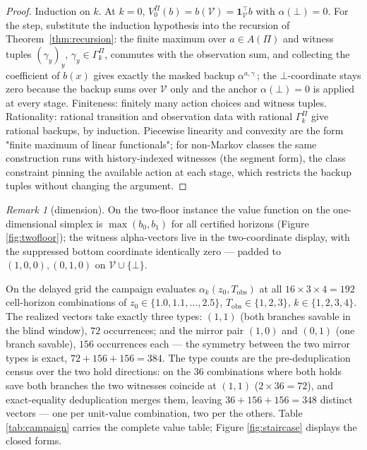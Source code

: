 \documentclass[10pt,twocolumn]{article}
\theoremstyle{plain}
\theoremstyle{definition}
\theoremstyle{remark}
\newtheorem{remark}[theorem]{Remark}
\begin{document}
\begin{proof}
Induction on \(k\). At \(k = 0\),
\(V^{\Pi}_{0}(b) = b(\mathcal{V}) = \mathbf{1}_{\mathcal{V}}^{\top} b\)
with \(\alpha(\bot) = 0\). For the step, substitute the induction
hypothesis into the recursion of Theorem~\ref{thm:recursion}: the finite
maximum over \(a \in A(\Pi)\) and witness tuples
\((\gamma_{y})_{y}\), \(\gamma_{y} \in \Gamma^{\Pi}_{k}\), commutes
with the observation sum, and collecting the coefficient of \(b(x)\)
gives exactly the masked backup \(\alpha^{a, \gamma_{\cdot}}\); the
\(\bot\)-coordinate stays zero because the backup sums over
\(\mathcal{V}\) only and the anchor \(\alpha(\bot) = 0\) is applied
at every stage. Finiteness: finitely many action choices and witness
tuples. Rationality: rational transition and observation data with
rational \(\Gamma^{\Pi}_{k}\) give rational backups, by induction.
Piecewise linearity and convexity are the form "finite maximum of linear
functionals"; for non-Markov classes the same construction runs with
history-indexed witnesses (the segment form), the class constraint
pinning the available action at each stage, which restricts the backup
tuples without changing the argument.
\end{proof}

\begin{remark}[dimension]\label{rem:dim}
On the two-floor instance the value function on the one-dimensional
simplex is \(\max(b_{0}, b_{1})\) for all certified horizons (Figure
\ref{fig:twofloor}); the witness alpha-vectors live in the two-coordinate
display, with the suppressed bottom coordinate identically zero --- padded
to \((1,0,0), (0,1,0)\) on \(\mathcal{V} \cup \{\bot\}\).
\end{remark}

On the delayed grid the campaign evaluates
\(\alpha_{k}(z_{0}, T_{\mathrm{obs}})\) at all
\(16 \times 3 \times 4 = 192\) cell-horizon combinations of
\(z_{0} \in \{1.0, 1.1, \dots, 2.5\}\),
\(T_{\mathrm{obs}} \in \{1, 2, 3\}\), \(k \in \{1, 2, 3, 4\}\). The
realized vectors take exactly three types: \((1, 1)\) (both branches
savable in the blind window), \(72\) occurrences; and the mirror pair
\((1, 0)\) and \((0, 1)\) (one branch savable), \(156\) occurrences each
--- the symmetry between the two mirror types is exact,
\(72 + 156 + 156 = 384\). The type counts are the pre-deduplication
census over the two hold directions: on the \(36\) combinations where
both holds save both branches the two witnesses coincide at \((1, 1)\)
(\(2 \times 36 = 72\)), and exact-equality deduplication merges them,
leaving \(36 + 156 + 156 = 348\) distinct vectors --- one per
unit-value combination, two per the others. Table \ref{tab:campaign}
carries the complete value table; Figure \ref{fig:staircase} displays
the closed forms.
\end{document}
